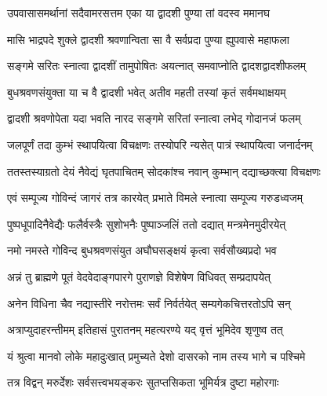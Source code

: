 
\label{sec:padma-shravana-dvadashi}

\ganapatyadiDhyanam

\padmaPuranam



\twolineshloka
{उपवासासमर्थानां सदैवामरसत्तम}
{एका या द्वादशी पुण्या तां वदस्व ममानघ}%


\twolineshloka
{मासि भाद्रपदे शुक्ले द्वादशी श्रवणान्विता}
{सा वै सर्वप्रदा पुण्या ह्युपवासे महाफला}%

\twolineshloka
{सङ्गमे सरितः स्नात्वा द्वादशीं तामुपोषितः}
{अयत्नात् समवाप्नोति द्वादशद्वादशीफलम्}%

\twolineshloka
{बुधश्रवणसंयुक्ता या च वै द्वादशी भवेत्}
{अतीव महती तस्यां कृतं सर्वमथाक्षयम्}%

\twolineshloka
{द्वादशी श्रवणोपेता यदा भवति नारद}
{सङ्गमे सरितां स्नात्वा लभेद् गोदानजं फलम्}%

\twolineshloka
{जलपूर्णं तदा कुम्भं स्थापयित्वा विचक्षणः}
{तस्योपरि न्यसेत् पात्रं स्थापयित्वा जनार्दनम्}%

\twolineshloka
{ततस्तस्याग्रतो देयं नैवेद्यं घृतपाचितम्}
{सोदकांश्च नवान् कुम्भान् दद्याच्छक्त्या विचक्षणः}%

\twolineshloka
{एवं सम्पूज्य गोविन्दं जागरं तत्र कारयेत्}
{प्रभाते विमले स्नात्वा सम्पूज्य गरुडध्वजम्}%

\twolineshloka
{पुष्पधूपादिनैवेद्यैः फलैर्वस्त्रैः सुशोभनैः}
{पुष्पाञ्जलिं ततो दद्यात् मन्त्रमेनमुदीरयेत्}%

\twolineshloka
{नमो नमस्ते गोविन्द बुधश्रवणसंयुत}
{अघौघसङ्क्षयं कृत्वा सर्वसौख्यप्रदो भव}%

\twolineshloka
{अन्नं तु ब्राह्मणे पूतं वेदवेदाङ्गपारगे}
{पुराणज्ञे विशेषेण विधिवत् सम्प्रदापयेत्}%

\twolineshloka
{अनेन विधिना चैव नद्यास्तीरे नरोत्तमः}
{सर्वं निर्वर्तयेत् सम्यगेकचित्तरतोऽपि सन्}%

\twolineshloka
{अत्राप्युदाहरन्तीमम् इतिहासं पुरातनम्}
{महत्यरण्ये यद् वृत्तं भूमिदेव शृणुष्व तत्}%

\twolineshloka
{यं श्रुत्वा मानवो लोके महादुःखात् प्रमुच्यते}
{देशो दासरको नाम तस्य भागे च पश्चिमे}%

\twolineshloka
{तत्र विद्वन् मरुर्देशः सर्वसत्त्वभयङ्करः}
{सुतप्तसिकता भूमिर्यत्र दुष्टा महोरगाः}%

